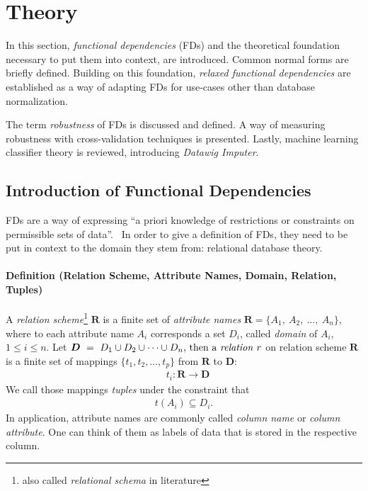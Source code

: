 \newpage
\section{Theory}

In this section, \emph{functional dependencies} (FDs) and the theoretical foundation necessary to put them into context, are introduced.
Common normal forms are briefly defined.
Building on this foundation, \emph{relaxed functional dependencies} are established as a way of adapting FDs for use-cases other than database normalization.

The term \emph{robustness} of FDs is discussed and defined.
A way of measuring robustness with cross-validation techniques is presented.
Lastly, machine learning classifier theory is reviewed, introducing \emph{Datawig Imputer}.

\subsection{Introduction of Functional Dependencies}
FDs are a way of expressing ``a priori knowledge of restrictions or constraints on permissible sets of data''.~\cite[p.~42]{MAI83}
In order to give a definition of FDs, they need to be put in context to the domain they stem from: relational database theory.

\paragraph{Definition (Relation Scheme, Attribute Names, Domain, Relation, Tuples)} A \emph{relation scheme}\footnote{also called \emph{relational schema} in literature\cite[p.21]{ABE19} } \(\boldsymbol{R}\) is a finite set of \emph{attribute names} \( \boldsymbol{R} = \{A_1,~A_2,~\dots,~A_n\}\), where to each attribute name \(A_i\) corresponds a set \(D_i\), called \emph{domain} of \(A_i\), \(1 \leq i \leq n\).
Let \(\boldsymbol{D}~=~D_1 \cup D_2 \cup \dots \cup D_n$, then a \emph{relation} \(r\) on relation scheme \(\boldsymbol{R}\) is a finite set of mappings \(\{t_1, t_2, \dots, t_p\}\) from \(\boldsymbol{R}\) to \(\boldsymbol{D}\):
\begin{align*}
  &t_i: \boldsymbol{R} \to \boldsymbol{D}
\end{align*}
We call those mappings \emph{tuples} under the constraint that~\cite[p.2]{MAI83}
\begin{align*}
    t(A_i) \subseteq D_i.
\end{align*}
In application, attribute names are commonly called \emph{column name} or \emph{column attribute}.
One can think of them as labels of data that is stored in the respective column.


